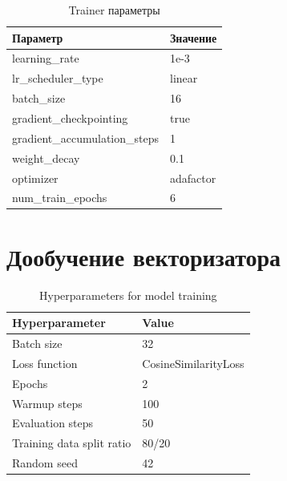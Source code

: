 \begin{longtable}{ll}
\caption{Trainer параметры} \\
\hline
\textbf{Параметр} & \textbf{Значение} \\
\hline
learning\_rate & 1e-3 \\
lr\_scheduler\_type & linear \\
batch\_size & 16 \\
gradient\_checkpointing & true \\
gradient\_accumulation\_steps & 1 \\
weight\_decay & 0.1 \\
optimizer & adafactor \\
num\_train\_epochs & 6 \\
\hline
\end{longtable}

\chapter{Дообучение векторизатора}

\begin{table}[H]
\centering
\begin{tabular}{|l|l|}
\hline
\textbf{Hyperparameter}    & \textbf{Value} \\ \hline
Batch size                 & 32    \\ \hline
Loss function              & CosineSimilarityLoss \\ \hline
Epochs                     & 2     \\ \hline
Warmup steps               & 100   \\ \hline
Evaluation steps           & 50    \\ \hline
Training data split ratio  & 80/20 \\ \hline
Random seed                & 42    \\ \hline
\end{tabular}
\caption{Hyperparameters for model training}
\label{tab:hyperparameters}
\end{table}
